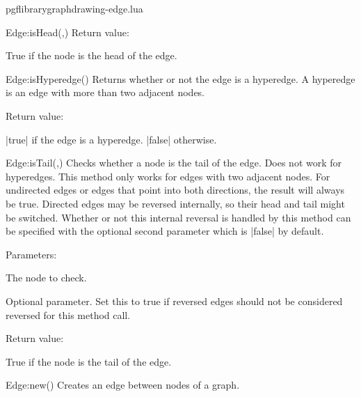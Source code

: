 \begin{filedescription}{pgflibrarygraphdrawing-edge.lua}
\begin{luacommand}{{Edge:isHead}(,)}
Return value:
\begin{parameterdescription} 
  \item[] True if the node is the head of the edge. 
\end{parameterdescription}


\end{luacommand}
\begin{luacommand}{{Edge:isHyperedge}()}
Returns whether or not the edge is a hyperedge.  A hyperedge is an edge with more than two adjacent nodes. 


Return value:
\begin{parameterdescription} 
  \item[] |true| if the edge is a hyperedge. |false| otherwise. 
\end{parameterdescription}


\end{luacommand}
\begin{luacommand}{{Edge:isTail}(,)}
Checks whether a node is the tail of the edge. Does not work for hyperedges.  This method only works for edges with two adjacent nodes.  For undirected edges or edges that point into both directions, the result will always be true.  Directed edges may be reversed internally, so their head and tail might be switched. Whether or not this internal reversal is handled by this method can be specified with the optional second  parameter which is |false| by default. 

Parameters:
\begin{parameterdescription}
	\item[\meta{node}] The node to check.\item[\meta{ignore\_reversed}] Optional parameter. Set this to true if reversed edges should not be considered reversed for this method call. 
\end{parameterdescription}


Return value:
\begin{parameterdescription} 
  \item[] True if the node is the tail of the edge. 
\end{parameterdescription}


\end{luacommand}
\begin{luacommand}{{Edge:new}()}
Creates an edge between nodes of a graph. 


\end{luacommand}
\end{filedescription}
